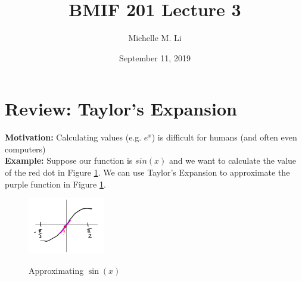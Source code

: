 \documentclass[12pt]{extarticle}
\title{BMIF 201 Lecture 3}
\author{Michelle M. Li}
\date{September 11, 2019}
\newcommand{\<}{\langle}
\renewcommand{\>}{\rangle}
\theoremstyle{definition}
\begin{document}
\maketitle

\section{Review: Taylor's Expansion}

\textbf{Motivation:} Calculating values (e.g. $e^x$) is difficult for humans (and often even computers)\\

\noindent \textbf{Example:} Suppose our function is $sin(x)$ and we want to calculate the value of the red dot in Figure \ref{fig1}. We can use Taylor's Expansion to approximate the purple function in Figure \ref{fig1}.

\begin{figure}[h]
\caption{Approximating $\sin (x)$}
\centering
\includegraphics[width=0.3\textwidth]{fig1.png}
\label{fig1}
\end{figure}
\end{document}
